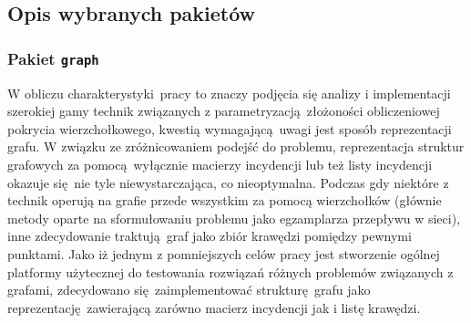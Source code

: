 \subsection{Opis wybranych pakietów}\label{ss_internals_important_packages}
\subsubsection{\textbf{Pakiet \texttt{graph}}}
\par{
  W obliczu charakterystyki pracy to znaczy podjęcia się analizy i implementacji szerokiej gamy technik związanych z parametryzacją złożoności obliczeniowej pokrycia wierzchołkowego, kwestią wymagającą uwagi jest sposób reprezentacji grafu.
  W związku ze zróżnicowaniem podejść do problemu, reprezentacja struktur grafowych za pomocą wyłącznie macierzy incydencji lub też listy incydencji okazuje się nie tyle niewystarczająca, co nieoptymalna.
  Podczas gdy niektóre z technik operują na grafie przede wszystkim za pomocą wierzchołków (głównie metody oparte na sformułowaniu problemu jako egzamplarza przepływu w sieci), inne zdecydowanie traktują graf jako zbiór krawędzi pomiędzy pewnymi punktami.
  Jako iż jednym z pomniejszych celów pracy jest stworzenie ogólnej platformy użytecznej do testowania rozwiązań różnych problemów związanych z grafami, zdecydowano się zaimplementować strukturę grafu jako reprezentację zawierającą zarówno macierz incydencji jak i listę krawędzi.
}
